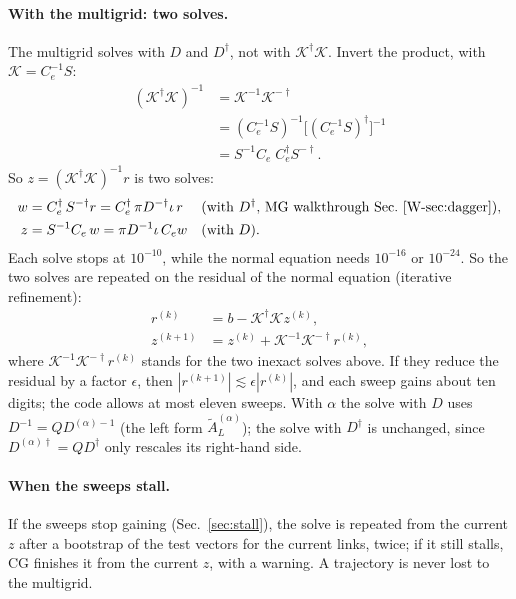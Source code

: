 \documentclass[11pt,a4paper]{article}
\numberwithin{equation}{section}
\newcommand{\dg}{^{\dagger}}
\newcommand{\AL}{\tilde A_{L}}
\newcommand{\Ce}{C_{e}}
\begin{document}
\paragraph{With the multigrid: two solves.}\label{sec:twosolves} The multigrid solves with $D$ and $D\dg$, not with
$\mathcal K\dg \mathcal K$. Invert the product, with $\mathcal K=\Ce^{-1}S$:
\begin{align}
(\mathcal K\dg \mathcal K)^{-1}&=\mathcal K^{-1}\mathcal K^{-\dagger}\nonumber\\
&=(\Ce^{-1}S)^{-1}\big[(\Ce^{-1}S)\dg\big]^{-1}\nonumber\\
&=S^{-1}\Ce\;\Ce\dg S^{-\dagger} .
\end{align}
So $z=(\mathcal K\dg \mathcal K)^{-1}r$ is two solves:
\begin{align}
w&=\Ce\dg\,S^{-\dagger}r=\Ce\dg\,\pi D^{-\dagger}\iota\,r &&\text{(with $D\dg$, MG walkthrough Sec.~\ref{W-sec:dagger})},\nonumber\\
z&=S^{-1}\Ce\,w=\pi D^{-1}\iota\,\Ce w &&\text{(with $D$)}.
\end{align}
Each solve stops at $10^{-10}$, while the normal equation needs $10^{-16}$ or $10^{-24}$. So the two
solves are repeated on the residual of the normal equation (iterative refinement):
\begin{align}
r^{(k)}&=b-\mathcal K\dg\mathcal Kz^{(k)},\nonumber\\
z^{(k+1)}&=z^{(k)}+\mathcal K^{-1}\mathcal K^{-\dagger}r^{(k)} ,
\end{align}
where $\mathcal K^{-1}\mathcal K^{-\dagger}r^{(k)}$ stands for the two inexact solves above. If
they reduce the residual by a factor $\epsilon$, then $|r^{(k+1)}|\lesssim\epsilon|r^{(k)}|$,
and each sweep gains about ten digits; the code allows at most eleven sweeps. With $\alpha$ the solve with $D$ uses
$D^{-1}=QD^{(\alpha)-1}$ (the left form $\AL^{(\alpha)}$); the solve with $D\dg$ is unchanged, since
$D^{(\alpha)\dagger}=QD\dg$ only rescales its right-hand side.

\paragraph{When the sweeps stall.} If the sweeps stop gaining (Sec.~\ref{sec:stall}), the solve
is repeated from the current $z$ after a bootstrap of the test vectors for the current links,
twice; if it still stalls, CG finishes it from the current $z$, with a warning. A trajectory is
never lost to the multigrid.
\end{document}

